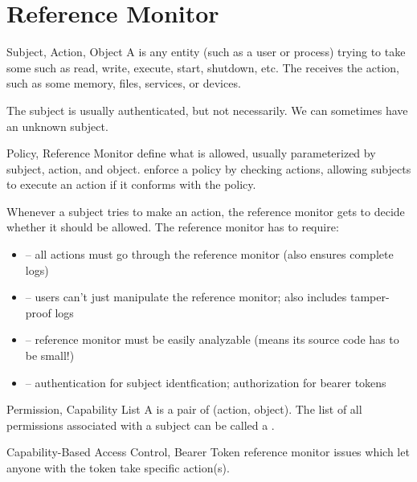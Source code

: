 \documentclass[code]{amznotes}
\begin{document}
\section{Reference Monitor}

\begin{dfnbox}{Subject, Action, Object}{}
    A  is any entity (such as a user or process) trying to take some  such as read, write, execute, start, shutdown, etc. The  receives the action, such as some memory, files, services, or devices.
\end{dfnbox}

The subject is usually authenticated, but not necessarily. We can sometimes have an unknown subject.

\begin{dfnbox}{Policy, Reference Monitor}{}
     define what is allowed, usually parameterized by subject, action, and object.  enforce a policy by checking actions, allowing subjects to execute an action if it conforms with the policy.
\end{dfnbox}

Whenever a subject tries to make an action, the reference monitor gets to decide whether it should be allowed. The reference monitor has to require:

\begin{itemize}
    \item {} -- all actions must go through the reference monitor (also ensures complete logs)
    \item {} -- users can't just manipulate the reference monitor; also includes tamper-proof logs
    \item {} -- reference monitor must be easily analyzable (means its source code has to be small!)
    \item {} -- authentication for subject identfication; authorization for bearer tokens
\end{itemize}

\begin{dfnbox}{Permission, Capability List}{}
    A  is a pair of (action, object). The list of all permissions associated with a subject can be called a .
\end{dfnbox}

\begin{dfnbox}{Capability-Based Access Control, Bearer Token}{}
     reference monitor issues  which let anyone with the token take specific action(s).
\end{dfnbox}
\end{document}
